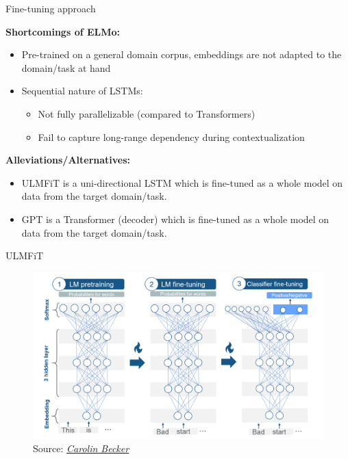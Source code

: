 \documentclass[]{beamer}
\begin{document}
\begin{frame}{Fine-tuning approach}

	\textbf{Shortcomings of ELMo:}

	\begin{itemize}
		\item Pre-trained on a general domain corpus, embeddings are not adapted to the domain/task at hand
		\item Sequential nature of LSTMs:
			\begin{itemize}
				\item Not fully parallelizable (compared to Transformers)
				\item Fail to capture long-range dependency during contextualization
			\end{itemize}
	\end{itemize}

	\vspace{.3cm}
	
	\textbf{Alleviations/Alternatives:}

	\begin{itemize}
		\item ULMFiT \href{https://www.aclweb.org/anthology/P18-1031.pdf}{} is a uni-directional LSTM which is fine-tuned as a whole model on data from the target domain/task.
		\item GPT \href{https://s3-us-west-2.amazonaws.com/openai-assets/research-covers/language-unsupervised/language_understanding_paper.pdf}{} is a Transformer (decoder) which is fine-tuned as a whole model on data from the target domain/task.
	\end{itemize}
\end{frame}



\begin{frame}{ULMFiT \href{https://www.aclweb.org/anthology/P18-1031.pdf}{}}
	\begin{figure}
		\centering
		\includegraphics[width = 12cm]{figure/ulmfit-overview-new}\\ 
		\footnotesize{Source:} \href{https://compstat-lmu.github.io/seminar_nlp_ss20/transfer-learning-for-nlp-i.html}{\footnotesize \it Carolin Becker}
	\end{figure}
\end{frame}
\end{document}
